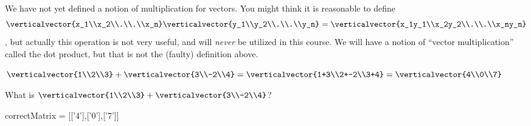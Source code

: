 \documentclass{ximera}
\begin{document}
 	\begin{warning}
 	  We have not yet defined a notion of multiplication for vectors.  You might think it is reasonable to define 
 	  \[\verticalvector{x_1\\x_2\\.\\.\\x_n} \verticalvector{y_1\\y_2\\.\\.\\y_n}=\verticalvector{x_1y_1\\x_2y_2\\.\\.\\x_ny_n}\], but 
 	  actually this operation is not very useful, and will \textit{never} be utilized in this course.  We will have a notion of ``vector multiplication'' called the dot 
 	  product, but that is not the (faulty) definition above.
 	\end{warning}
 	
 	\begin{question}
 		\begin{solution}
 		\begin{hint}
 			$\verticalvector{1\\2\\3}+\verticalvector{3\\-2\\4} = \verticalvector{1+3\\2+-2\\3+4} = \verticalvector{4\\0\\7}$
 		\end{hint}
 		What is $\verticalvector{1\\2\\3}+\verticalvector{3\\-2\\4}$?
 		
 		\begin{matrix-answer}[name=v]
 			correctMatrix = [['4'],['0'],['7']]
 		\end{matrix-answer}
 		\end{solution}
 	\end{question}
 	
\end{document}
